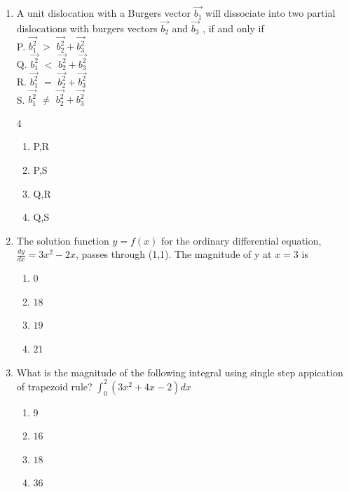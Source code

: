 \documentclass[journal]{IEEEtran}
\theoremstyle{remark}
\begin{document}
\begin{enumerate}
\item  A unit dislocation with a Burgers vector $\vec{b_1}$ will dissociate into two partial dislocations with burgers vectors $\vec{b_2}$ and $\vec{b_3}$ , if and only if  \hfill{}\\
P. $\vec{b_1^2}$ $>$ $\vec{b_2^2} + \vec{b_3^2}$\\
Q. $\vec{b_1^2}$ $<$ $\vec{b_2^2} + \vec{b_3^2}$\\
R. $\vec{b_1^2}$ $=$ $\vec{b_2^2} + \vec{b_3^2}$\\
S. $\vec{b_1^2}$ $\neq$ $\vec{b_2^2} + \vec{b_3^2}$\\
\begin {multicols}{4}
\begin{enumerate}
\item P,R
\item P,S
\item Q,R
\item Q,S
\end{enumerate}
\end{multicols}

\item The solution function $y=f(x)$ for the ordinary differential equation, $\frac{dy}{dx} = 3x^2 - 2x$, passes through (1,1). The magnitude of y at $x=3 $ is
\hfill{}
\begin{multicols}{4}
\begin{enumerate}
\item $0$
\item $18$
\item $19$
\item $21$
\end{enumerate}
\end{multicols}

\item What is the magnitude of the following integral using single step appication of trapezoid rule? $\int_0^2(3x^2 + 4x  -2)dx$ \hfill{}
\begin{multicols}{4}
\begin{enumerate}
\item $9$
\item $16$
\item $18$
\item $36$
\end{enumerate}
\end{multicols}


\end{enumerate}
\end{document}
